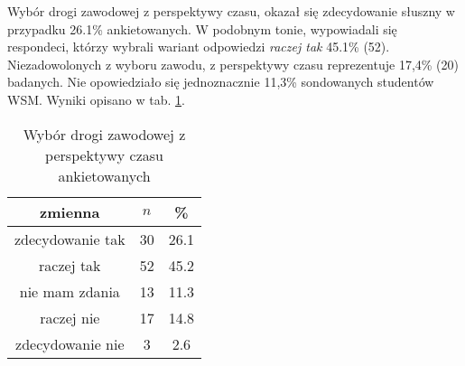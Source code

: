 


Wybór drogi zawodowej z perspektywy czasu, okazał się  zdecydowanie słuszny w przypadku 26.1\% ankietowanych. W podobnym tonie, wypowiadali się respondeci, którzy wybrali wariant odpowiedzi \textit{raczej tak} 45.1\% (52). Niezadowolonych z wyboru zawodu, z perspektywy czasu reprezentuje 17,4\% (20) badanych. Nie opowiedziało się jednoznacznie 11,3\% sondowanych studentów WSM. Wyniki opisano w tab. \ref{tab:Q36}.
\begin{table}[H]
\caption{Wybór drogi zawodowej z perspektywy czasu ankietowanych}
\centering
\begin{tabular}{ | c | c | c |}
\hline
zmienna & $n$ & \% \\
\hline
zdecydowanie tak  &  30  & 26.1\\
\hline
raczej tak  &  52  & 45.2 \\
\hline
nie mam zdania  &  13  & 11.3 \\
\hline
raczej nie  &  17  & 14.8 \\
\hline
zdecydowanie nie  &  3  & 2.6\\
\hline
\end{tabular}
\label{tab:Q36}
\end{table}
